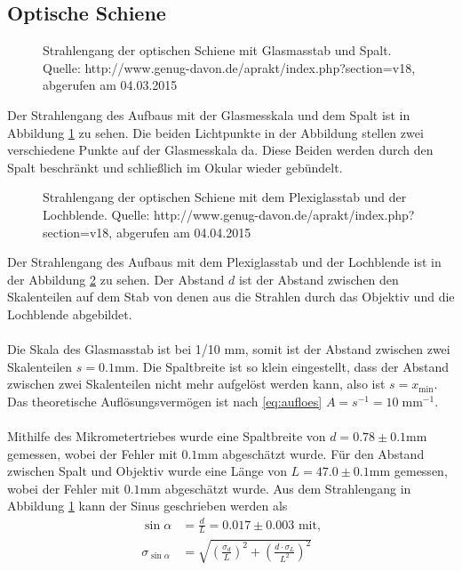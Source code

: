 \documentclass[12pt,a4paper,titlepage,headinclude]{scrartcl}
\numberwithin{equation}{subsection}
\begin{document}
\subsection{Optische Schiene}
\begin{figure}[!h]
\centering
\resizebox{\textwidth}{!}{}
\caption{Strahlengang der optischen Schiene mit Glasmasstab und Spalt. Quelle: http://www.genug-davon.de/aprakt/index.php?section=v18, abgerufen am 04.03.2015}
\label{fig:strahl1}
\end{figure}
Der Strahlengang des Aufbaus mit der Glasmesskala und dem Spalt ist in Abbildung \ref{fig:strahl1} zu sehen.
Die beiden Lichtpunkte in der Abbildung stellen zwei verschiedene Punkte auf der Glasmesskala da.
Diese Beiden werden durch den Spalt beschränkt und schließlich im Okular wieder gebündelt.\\
\begin{figure}[!h]
\centering
\resizebox{\textwidth}{!}{}
\caption{Strahlengang der optischen Schiene mit dem Plexiglasstab und der Lochblende. Quelle: http://www.genug-davon.de/aprakt/index.php?section=v18, abgerufen am 04.04.2015}
\label{fig:strahl2}
\end{figure}
Der Strahlengang des Aufbaus mit dem Plexiglasstab und der Lochblende ist in der Abbildung \ref{fig:strahl2} zu sehen.
Der Abstand $d$ ist der Abstand zwischen den Skalenteilen auf dem Stab von denen aus die Strahlen durch das Objektiv und die Lochblende abgebildet.\\\\
Die Skala des Glasmasstab ist bei 1/10 \si{\milli\meter}, somit ist der Abstand zwischen zwei Skalenteilen $s=0.1\si{\milli\meter}$.
Die Spaltbreite ist so klein eingestellt, dass der Abstand zwischen zwei Skalenteilen nicht mehr aufgelöst werden kann, also ist $s=x_\text{min}$.
Das theoretische Auflösungsvermögen ist nach \eqref{eq:aufloes} $A=s^{-1}=10\;\text{mm}^{-1}$.\\\\
Mithilfe des Mikrometertriebes wurde eine Spaltbreite von $d=0.78\pm0.1\si{\milli\meter}$ gemessen, wobei der Fehler mit $0.1\si{\milli\meter}$ abgeschätzt wurde.
Für den Abstand zwischen Spalt und Objektiv wurde eine Länge von $L=47.0\pm0.1\si{\milli\meter}$ gemessen, wobei der Fehler mit $0.1\si{\milli\meter}$ abgeschätzt wurde.
Aus dem Strahlengang in Abbildung \ref{fig:strahl1} kann der Sinus geschrieben werden als
\begin{align}
	\sin{\alpha}&=\frac{d}{L}=0.017\pm0.003  \text{ mit,}\\
	\sigma_{\sin{\alpha}}&=\sqrt{\left( \frac{\sigma_d}{L} \right)^{2}+\left( \frac{d\cdot\sigma_L}{L^{2}} \right)^{2}}
\end{align}
\end{document}
